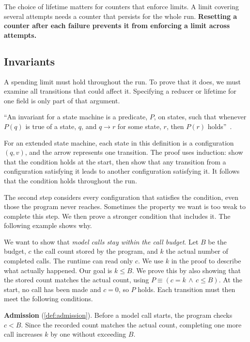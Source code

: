 \ei

The choice of lifetime matters for counters that enforce limits. A limit covering several
attempts needs a counter that persists for the whole run. \textbf{Resetting a counter after each
failure prevents it from enforcing a limit across attempts.}

\subsection{Invariants}
\label{sec:state-invariants}

A spending limit must hold throughout the run. To prove that it does, we must examine all
transitions that could affect it. Specifying a reducer or lifetime for one field is only part
of that argument.

\begin{definition}[Invariant]
\label{def:invariant}
``An invariant for a state machine is a predicate, $P$, on states, such that whenever $P(q)$ is true
of a state, $q$, and $q \to r$ for some state, $r$, then $P(r)$ holds''~\citep[p.~5]{mit6042-lec16}.
\end{definition}

For an extended state machine, each state in this definition is a configuration $(q, v)$, and
the arrow represents one transition. The proof uses induction: show that the condition holds
at the start, then show that any transition from a configuration satisfying it leads to
another configuration satisfying it. It follows that the condition holds throughout the run.

The second step considers every configuration that satisfies the condition, even those the
program never reaches. Sometimes the property we want is too weak to complete this step. We
then prove a stronger condition that includes it. The following example shows why.

We want to show that \emph{model calls stay within the call budget}. Let $B$ be the budget, $c$
the call count stored by the program, and $k$ the actual number of completed calls. The runtime
can read only $c$. We use $k$ in the proof to describe what actually happened. Our goal is
$k \leq B$. We prove this by also showing that the stored count matches the actual count, using
$P \equiv (c = k \,\wedge\, c \leq B)$. At the start, no call has been made and $c = 0$, so $P$
holds. Each transition must then meet the following conditions.

\bi

\item \textbf{Admission} (\cref{def:admission}). Before a model call starts, the program checks
$c < B$. Since the recorded count matches the actual count, completing one more call increases
$k$ by one without exceeding $B$.

